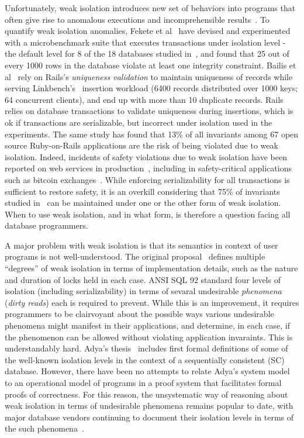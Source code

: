 Unfortunately, weak isolation introduces new set of behaviors into
programs that often give rise to anomalous executions and
incomprehensible results~\cite{pldi15}. To quantify weak isolation
anomalies, Fekete et al~\cite{feketevldb09} have devised and
experimented with a microbenchmark suite that executes transactions
under  isolation level - the default level for 8
of the 18 databases studied in~\cite{bailishotos}, and found that 25
out of every 1000 rows in the database violate at least one integrity
constraint. Bailis et al~\cite{bailisferal} rely on Rails's
\emph{uniqueness validation} to maintain uniqueness of records while
serving Linkbench's~\cite{linkbench} insertion workload (6400 records
distributed over 1000 keys; 64 concurrent clients), and end up with
more than 10 duplicate records. Rails relies on database transactions
to validate uniqueness during insertions, which is ok if transactions
are serializable, but incorrect under  isolation
used in the experiments. The same study has found that 13\% of all
invariants among 67 open source Ruby-on-Rails applications are the
risk of being violated due to weak isolation. Indeed, incidents of
safety violations due to weak isolation have been reported on web
services in production~\cite{starbucksbug, scimedbug}, including in
safety-critical applications such as bitcoin
exchanges~\cite{poloniexbug, bitcoinbug}. While enforcing
serializability for all transactions is sufficient to restore safety,
it is an overkill considering that 75\% of invariants studied
in~\cite{bailisferal} can be maintained under one or the other form of
weak isolation. When to use weak isolation, and in what form, is
therefore a question facing all database programmers.

A major problem with weak isolation is that its semantics in context
of user programs is not well-understood. The original
proposal~\cite{gray1976} defines multiple ``degrees'' of weak
isolation in terms of implementation details, such as the nature and
duration of locks held in each case. ANSI SQL 92 standard four levels
of isolation (including serializability) in terms of sevaral
undesirable \emph{phenomena} (\eg \emph{dirty reads}) each is required
to prevent. While this is an improvement, it requires programmers to
be clairvoyant about the possible ways various undesirable phenomena
might manifest in their applications, and determine, in each case, if
the phenomenon can be allowed without violating application
invaraints. This is understandably hard. Adya's thesis~\cite{adyaphd}
includes first formal definitions of some of the well-known isolation
levels in the context of a sequentially consistent (SC) database.
However, there have been no attempts to relate Adya's system model to
an operational model of programs in a proof system that facilitates
formal proofs of correctness. For this reason, the unsystematic way of
reasoning about weak isolation in terms of undesirable phenomena
remains popular to date, with major database vendors continuing to
document their isolation levels in terms of the such
phenomena~\cite{postgresiso, mysqliso, oracleiso}.

